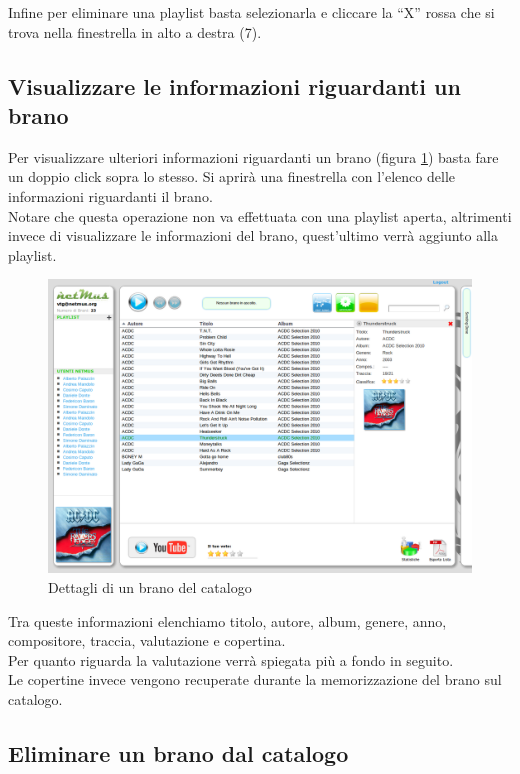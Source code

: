 Infine per eliminare una playlist basta selezionarla e cliccare la ``X'' rossa che
si trova nella finestrella in alto a destra (7).

\subsection{Visualizzare le informazioni riguardanti un brano}

Per visualizzare ulteriori informazioni riguardanti un brano (figura
\ref{fig:dettagli}) basta fare un doppio click sopra lo stesso. Si aprir\`a una
finestrella con l'elenco delle informazioni riguardanti il brano.\\
Notare che questa operazione non va effettuata con una playlist aperta,
altrimenti invece di visualizzare le informazioni del brano, quest'ultimo
verr\`a aggiunto alla playlist.\\

\begin{figure}[!htbp]
  \centering
  \includegraphics[width=14cm]{img/MU/info_song.png}
\caption{Dettagli di un brano del catalogo}
\label{fig:dettagli}
\end{figure}

Tra queste informazioni elenchiamo titolo, autore, album, genere, anno,
compositore, traccia, valutazione e copertina.\\
Per quanto riguarda la valutazione verr\`a spiegata pi\`u a fondo in seguito.\\
Le copertine invece vengono recuperate durante la memorizzazione del brano sul
catalogo.

\subsection{Eliminare un brano dal catalogo}

